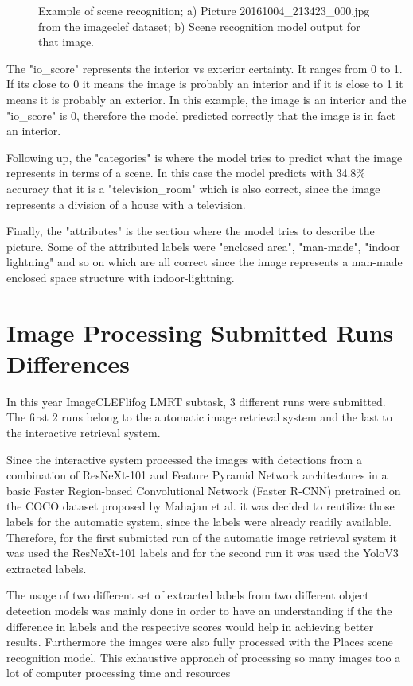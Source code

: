 \begin{figure}[H]
    \caption[Example of scene recognition]{Example of scene recognition; a) Picture 20161004\_213423\_000.jpg from the imageclef dataset; b) Scene recognition model output for that image.}

    \label{fig:imagea}
    \end{figure}


    The "io\_score" represents the interior vs exterior certainty. It ranges from 0 to 1. If its close to 0 it means the image is probably an interior and if it is close to 1 it means it is probably an exterior. In this example, the image is an interior and the "io\_score" is 0, therefore the model predicted correctly that the image is in fact an interior.

    Following up, the "categories" is where the model tries to predict what the image represents in terms of a scene. In this case the model predicts with 34.8\% accuracy that it is a "television\_room" which is also correct, since the image represents a division of a house with a television.

    Finally, the "attributes" is the section where the model tries to describe the picture. Some of the attributed labels were "enclosed area", "man-made", "indoor lightning" and so on which are all correct since the image represents a man-made enclosed space structure with indoor-lightning.

\section{Image Processing Submitted Runs Differences}
\label{sec:runs}


    In this year ImageCLEFlifog LMRT subtask, 3 different runs were submitted. The first 2 runs belong to the automatic image retrieval system and the last to the interactive retrieval system. 
    
    Since the interactive system processed the images with detections from a combination of ResNeXt-101 and Feature Pyramid Network architectures in a basic Faster Region-based Convolutional Network (Faster R-CNN) pretrained on the COCO dataset proposed by Mahajan et al. \cite{Mahajan2018} it was decided to reutilize those labels for the automatic system, since the labels were already readily available.  Therefore, for the first submitted run of the automatic image retrieval system it was used the ResNeXt-101 labels and for the second run it was used the YoloV3 \cite{Redmon2018} extracted labels.
    
    The usage of two different set of extracted labels from two different object detection models was mainly done in order to have an understanding if the the difference in labels and the respective scores would help in achieving better results. Furthermore the images were also fully processed with the Places scene recognition model. This exhaustive approach of processing so many images too a  lot of computer processing time and resources


